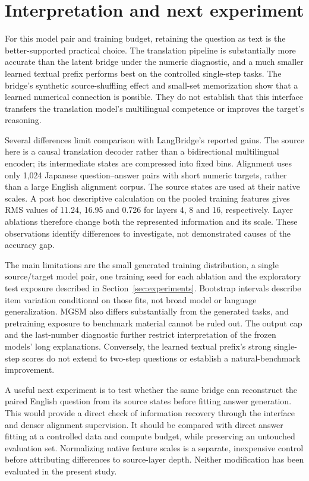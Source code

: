 \section{Interpretation and next experiment}

For this model pair and training budget, retaining the question as text is the
better-supported practical choice.
The translation pipeline is substantially more accurate than the latent bridge
under the numeric diagnostic, and a much smaller learned textual prefix performs
best on the controlled single-step tasks.
The bridge's synthetic source-shuffling effect and small-set memorization show
that a learned numerical connection is possible.
They do not establish that this interface transfers the translation model's
multilingual competence or improves the target's reasoning.

Several differences limit comparison with LangBridge's reported gains.
The source here is a causal translation decoder rather than a bidirectional
multilingual encoder; its intermediate states are compressed into fixed bins.
Alignment uses only 1,024 Japanese question--answer pairs with short numeric
targets, rather than a large English alignment corpus.
The source states are used at their native scales.
A post hoc descriptive calculation on the pooled training features gives RMS
values of 11.24, 16.95 and 0.726 for layers 4, 8 and 16, respectively.
Layer ablations therefore change both the represented information and its scale.
These observations identify differences to investigate, not demonstrated causes
of the accuracy gap.

The main limitations are the small generated training distribution, a single
source/target model pair, one training seed for each ablation and the exploratory
test exposure described in Section~\ref{sec:experiments}.
Bootstrap intervals describe item variation conditional on those fits, not broad
model or language generalization.
MGSM also differs substantially from the generated tasks, and pretraining
exposure to benchmark material cannot be ruled out.
The output cap and the last-number diagnostic further restrict interpretation of
the frozen models' long explanations.
Conversely, the learned textual prefix's strong single-step scores do not extend
to two-step questions or establish a natural-benchmark improvement.

A useful next experiment is to test whether the same bridge can reconstruct the
paired English question from its source states before fitting answer generation.
This would provide a direct check of information recovery through the interface
and denser alignment supervision.
It should be compared with direct answer fitting at a controlled data and compute
budget, while preserving an untouched evaluation set.
Normalizing native feature scales is a separate, inexpensive control before
attributing differences to source-layer depth.
Neither modification has been evaluated in the present study.

